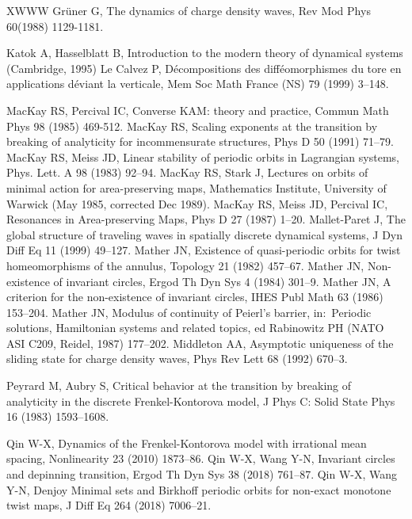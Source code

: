 \documentclass[12pt]{article}
\begin{document}
\begin{thebibliography}{XWWW}
 Gr\"{u}ner G, The dynamics of charge density waves, Rev Mod Phys 60(1988) 1129-1181.

 Katok A, Hasselblatt B, Introduction to the modern theory of dynamical systems (Cambridge, 1995)
 Le Calvez P, D\'ecompositions des diff\'eomorphismes du tore en applications d\'eviant la verticale, Mem Soc Math France (NS) 79 (1999) 3--148.

 MacKay RS, Percival IC, Converse KAM: theory and practice, Commun Math Phys 98 (1985) 469-512.
 MacKay RS, Scaling exponents at the transition
by breaking of analyticity for incommensurate structures, Phys D 50 (1991) 71--79.
 MacKay RS, Meiss JD, Linear stability of periodic orbits in Lagrangian systems, Phys. Lett. A 98 (1983) 92--94.
 MacKay RS, Stark J, Lectures on orbits of minimal action for area-preserving maps, Mathematics Institute, University of Warwick (May 1985, corrected Dec 1989).
 MacKay RS, Meiss JD, Percival IC, Resonances in Area-preserving Maps, Phys D 27 (1987) 1--20.
 Mallet-Paret J, The global structure of traveling waves in spatially discrete dynamical systems, J Dyn Diff Eq 11 (1999) 49--127.
 Mather JN, Existence of quasi-periodic orbits for twist homeomorphisms of the annulus, Topology 21 (1982) 457--67.
 Mather JN, Non-existence of invariant circles, Ergod Th Dyn Sys 4 (1984) 301--9.
 Mather JN, A criterion for the non-existence of invariant circles, IHES Publ Math 63 (1986) 153--204.
 Mather JN, Modulus of continuity of Peierl's barrier, in:~Periodic solutions, Hamiltonian systems and related topics, ed Rabinowitz PH (NATO ASI C209, Reidel, 1987) 177--202.
 Middleton AA, Asymptotic uniqueness of the sliding state for charge density waves, Phys Rev Lett 68 (1992) 670--3.

 Peyrard M,  Aubry S, Critical behavior at the transition by breaking of analyticity in the discrete Frenkel-Kontorova model, J Phys C: Solid State Phys 16 (1983) 1593--1608.

 Qin W-X, Dynamics of the Frenkel-Kontorova model with irrational mean spacing, Nonlinearity 23
(2010) 1873--86.
 Qin W-X, Wang Y-N, Invariant circles and depinning transition, Ergod Th Dyn Sys 38 (2018) 761--87.
 Qin W-X, Wang Y-N, Denjoy Minimal sets and Birkhoff periodic orbits for non-exact monotone twist maps, J Diff Eq 264 (2018) 7006--21.


\end{thebibliography}
\end{document}
